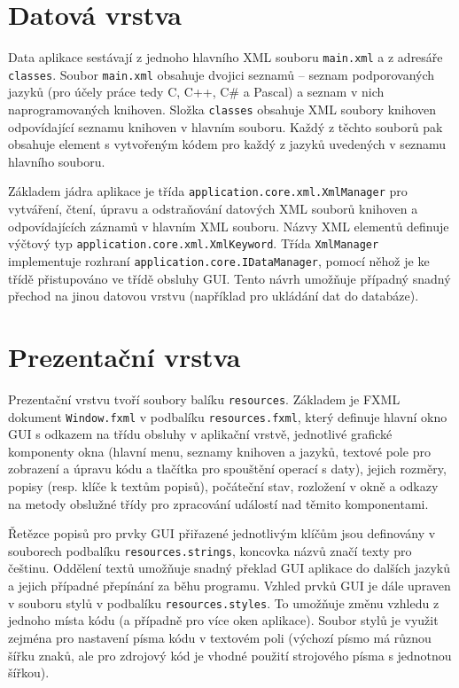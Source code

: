 \documentclass[onepage, a4paper, 12pt]{bakalarka}
\begin{document}
\section{Datová vrstva}

Data aplikace sestávají z jednoho hlavního XML souboru \texttt{main.xml} a z adresáře \texttt{classes}. Soubor \texttt{main.xml} obsahuje dvojici seznamů -- seznam podporovaných jazyků (pro účely práce tedy C, C++, C\# a Pascal) a seznam v nich naprogramovaných knihoven. Složka \texttt{classes} obsahuje XML soubory knihoven odpovídající seznamu knihoven v hlavním souboru. Každý z těchto souborů pak obsahuje element s vytvořeným kódem pro každý z jazyků uvedených v seznamu hlavního souboru.\par
Základem jádra aplikace je třída \texttt{application.core.xml.XmlManager} pro vytváření, čtení, úpravu a odstraňování datových XML souborů knihoven a odpovídajících záznamů v hlavním XML souboru. Názvy XML elementů definuje výčtový typ \texttt{application.core.xml.XmlKeyword}. Třída \texttt{XmlManager} implementuje rozhraní \texttt{application.core.IDataManager}, pomocí něhož je ke třídě přistupováno ve třídě obsluhy GUI. Tento návrh umožňuje případný snadný přechod na jinou datovou vrstvu (například pro ukládání dat do databáze).

\section{Prezentační vrstva}

Prezentační vrstvu tvoří soubory balíku \texttt{resources}. Základem je FXML dokument \texttt{Window.fxml} v podbalíku \texttt{resources.fxml}, který definuje hlavní okno GUI s odkazem na třídu obsluhy v aplikační vrstvě, jednotlivé grafické komponenty okna (hlavní menu, seznamy knihoven a jazyků, textové pole pro zobrazení a úpravu kódu a tlačítka pro spouštění operací s daty), jejich rozměry, popisy (resp. klíče k textům popisů), počáteční stav, rozložení v okně a odkazy na metody obslužné třídy pro zpracování událostí nad těmito komponentami.\par
Řetězce popisů pro prvky GUI přiřazené jednotlivým klíčům jsou definovány v souborech podbalíku \texttt{resources.strings}, koncovka názvů  značí texty pro češtinu. Oddělení textů umožňuje snadný překlad GUI aplikace do dalších jazyků a jejich případné přepínání za běhu programu. Vzhled prvků GUI je dále upraven v souboru stylů v podbalíku \texttt{resources.styles}. To umožňuje změnu vzhledu z jednoho místa kódu (a případně pro více oken aplikace). Soubor stylů je využit zejména pro nastavení písma kódu v textovém poli (výchozí písmo má různou šířku znaků, ale pro zdrojový kód je vhodné použití strojového písma s jednotnou šířkou).
\end{document}

